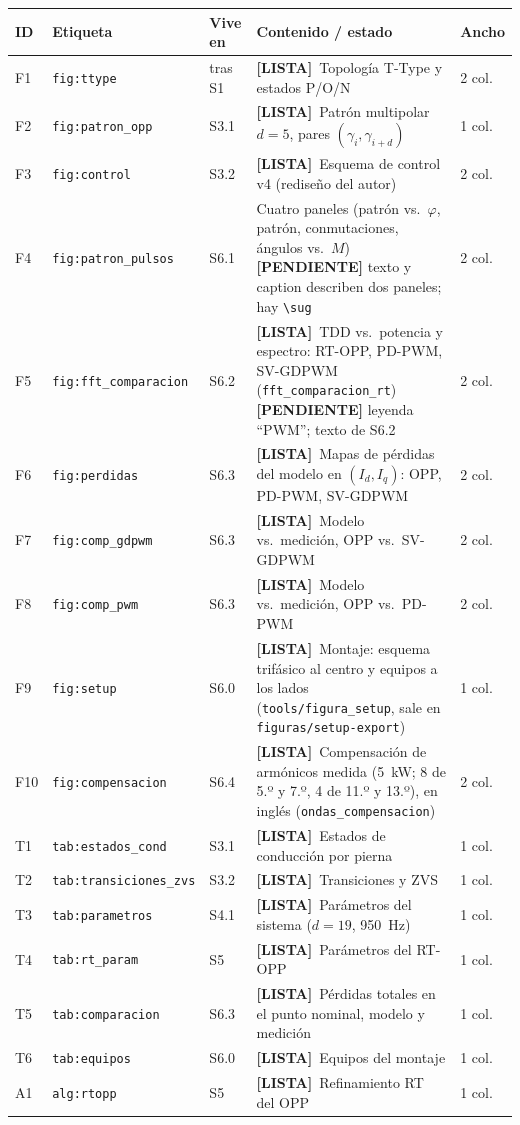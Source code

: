 \documentclass[11pt,a4paper]{article}
\newcommand{\pendiente}[1]{{\color{Warn}\textbf{[PENDIENTE]} #1}}
\newcommand{\listo}{{\color{Done}\textbf{[LISTA]}}\ }
\newcommand{\pct}{\text{\char`\%}}
\begin{document}
\noindent\begin{tabularx}{\textwidth}{lllXl}
\toprule
\textbf{ID} & \textbf{Etiqueta} & \textbf{Vive en} & \textbf{Contenido / estado} & \textbf{Ancho}\\
\midrule
F1 & \texttt{fig:ttype}          & tras S1 & \listo Topología T-Type y estados P/O/N & 2 col.\\
F2 & \texttt{fig:patron\_opp}    & S3.1 & \listo Patrón multipolar $d=5$, pares $(\gamma_i,\gamma_{i+d})$ & 1 col.\\
F3 & \texttt{fig:control}        & S3.2 & \listo Esquema de control v4 (rediseño del autor) & 2 col.\\
F4 & \texttt{fig:patron\_pulsos} & S6.1 & Cuatro paneles (patrón vs.\ $\varphi$, patrón, conmutaciones, ángulos vs.\ $M$) \pendiente{texto y caption describen dos paneles; hay \texttt{\textbackslash sug}} & 2 col.\\
F5 & \texttt{fig:fft\_comparacion} & S6.2 & \listo TDD vs.\ potencia y espectro: RT-OPP, PD-PWM, SV-GDPWM (\texttt{fft\_comparacion\_rt}) \pendiente{leyenda ``PWM''; texto de S6.2} & 2 col.\\
F6 & \texttt{fig:perdidas}       & S6.3 & \listo Mapas de pérdidas del modelo en $(I_d,I_q)$: OPP, PD-PWM, SV-GDPWM & 2 col.\\
F7 & \texttt{fig:comp\_gdpwm}    & S6.3 & \listo Modelo vs.\ medición, OPP vs.\ SV-GDPWM & 2 col.\\
F8 & \texttt{fig:comp\_pwm}      & S6.3 & \listo Modelo vs.\ medición, OPP vs.\ PD-PWM & 2 col.\\
F9 & \texttt{fig:setup}          & S6.0 & \listo Montaje: esquema trifásico al centro y equipos a los lados (\texttt{tools/figura\_setup}, sale en \texttt{figuras/setup-export}) & 1 col.\\
F10 & \texttt{fig:compensacion}  & S6.4 & \listo Compensación de armónicos medida (5~kW; 8\pct{} de 5.º y 7.º, 4\pct{} de 11.º y 13.º), en inglés (\texttt{ondas\_compensacion}) & 2 col.\\
\midrule
T1 & \texttt{tab:estados\_cond}  & S3.1 & \listo Estados de conducción por pierna & 1 col.\\
T2 & \texttt{tab:transiciones\_zvs} & S3.2 & \listo Transiciones y ZVS & 1 col.\\
T3 & \texttt{tab:parametros}     & S4.1 & \listo Parámetros del sistema ($d=19$, 950~Hz) & 1 col.\\
T4 & \texttt{tab:rt\_param}      & S5 & \listo Parámetros del RT-OPP & 1 col.\\
T5 & \texttt{tab:comparacion}    & S6.3 & \listo Pérdidas totales en el punto nominal, modelo y medición & 1 col.\\
T6 & \texttt{tab:equipos}        & S6.0 & \listo Equipos del montaje & 1 col.\\
\midrule
A1 & \texttt{alg:rtopp}          & S5 & \listo Refinamiento RT del OPP & 1 col.\\
\bottomrule
\end{tabularx}
\end{document}
